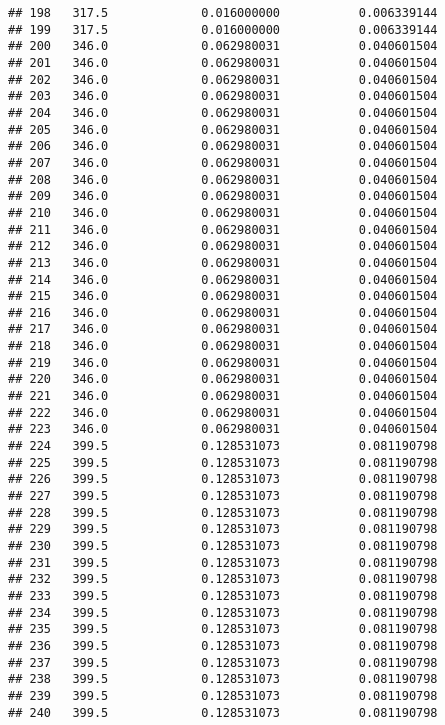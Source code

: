 \documentclass[]{article}
\begin{document}
\begin{verbatim}
## 198   317.5             0.016000000           0.006339144
## 199   317.5             0.016000000           0.006339144
## 200   346.0             0.062980031           0.040601504
## 201   346.0             0.062980031           0.040601504
## 202   346.0             0.062980031           0.040601504
## 203   346.0             0.062980031           0.040601504
## 204   346.0             0.062980031           0.040601504
## 205   346.0             0.062980031           0.040601504
## 206   346.0             0.062980031           0.040601504
## 207   346.0             0.062980031           0.040601504
## 208   346.0             0.062980031           0.040601504
## 209   346.0             0.062980031           0.040601504
## 210   346.0             0.062980031           0.040601504
## 211   346.0             0.062980031           0.040601504
## 212   346.0             0.062980031           0.040601504
## 213   346.0             0.062980031           0.040601504
## 214   346.0             0.062980031           0.040601504
## 215   346.0             0.062980031           0.040601504
## 216   346.0             0.062980031           0.040601504
## 217   346.0             0.062980031           0.040601504
## 218   346.0             0.062980031           0.040601504
## 219   346.0             0.062980031           0.040601504
## 220   346.0             0.062980031           0.040601504
## 221   346.0             0.062980031           0.040601504
## 222   346.0             0.062980031           0.040601504
## 223   346.0             0.062980031           0.040601504
## 224   399.5             0.128531073           0.081190798
## 225   399.5             0.128531073           0.081190798
## 226   399.5             0.128531073           0.081190798
## 227   399.5             0.128531073           0.081190798
## 228   399.5             0.128531073           0.081190798
## 229   399.5             0.128531073           0.081190798
## 230   399.5             0.128531073           0.081190798
## 231   399.5             0.128531073           0.081190798
## 232   399.5             0.128531073           0.081190798
## 233   399.5             0.128531073           0.081190798
## 234   399.5             0.128531073           0.081190798
## 235   399.5             0.128531073           0.081190798
## 236   399.5             0.128531073           0.081190798
## 237   399.5             0.128531073           0.081190798
## 238   399.5             0.128531073           0.081190798
## 239   399.5             0.128531073           0.081190798
## 240   399.5             0.128531073           0.081190798

\end{verbatim}
\end{document}
